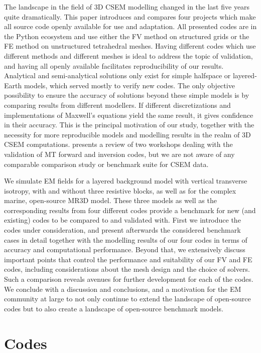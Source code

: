 \documentclass[extra, camera,%
]{gji}
\begin{document}
The landscape in the field of 3D CSEM modelling changed in the last five years quite dramatically. This paper introduces and compares four projects which make all source code openly available for use and adaptation. All presented codes are in the Python ecosystem and use either the FV method on structured grids or the FE method on unstructured tetrahedral meshes. Having different codes which use different methods and different meshes is ideal to address the topic of validation, and having all openly available facilitates reproducibility of our results. Analytical and semi-analytical solutions only exist for simple halfspace or layered-Earth models, which served mostly to verify new codes. The only objective possibility to ensure the accuracy of solutions beyond these simple models is by comparing results from different modellers. If different discretizations and implementations of Maxwell's equations yield the same result, it gives confidence in their accuracy. This is the principal motivation of our study, together with the necessity for more reproducible models and modelling results in the realm of 3D CSEM computations. \cite{GJI.13.Miensopust} presents a review of two workshops dealing with the validation of MT forward and inversion codes, but we are not aware of any comparable comparison study or benchmark suite for CSEM data.

We simulate EM fields for a layered background model with vertical transverse isotropy, with and without three resistive blocks, as well as for the complex marine, open-source MR3D model. These three models as well as the corresponding results from four different codes provide a benchmark for new (and existing) codes to be compared to and validated with. First we introduce the codes under consideration, and present afterwards the considered benchmark cases in detail together with the modelling results of our four codes in terms of accuracy and computational performance. Beyond that, we extensively discuss important points that control the performance and suitability of our FV and FE codes, including considerations about the mesh design and the choice of solvers. Such a comparison reveals avenues for further development for each of the codes. We conclude with a discussion and conclusions, and a motivation for the EM community at large to not only continue to extend the landscape of open-source codes but to also create a landscape of open-source benchmark models.

\section{Codes}
\end{document}
